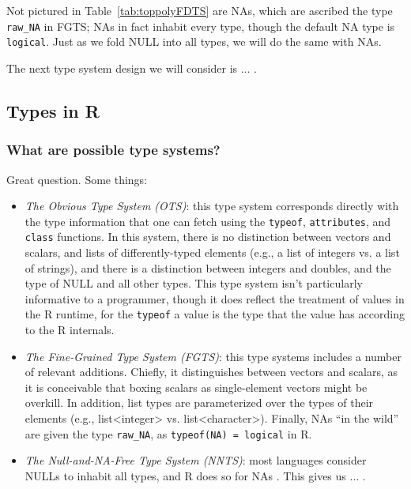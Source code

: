 \documentclass[acmsmall,10pt,review,anonymous]{acmart}\settopmatter{printfolios=true,printccs=false,printacmref=false}
\begin{document}
Not pictured in Table~\ref{tab:toppolyFDTS} are NAs, which are ascribed the type {\tt raw\_NA} in FGTS; NAs in fact inhabit every type, though the default NA type is {\tt logical}.
Just as we fold NULL into all types, we will do the same with NAs.

The next type system design we will consider is ... .

%
%
%
%
\subsection{Types in R}


%
%
\subsubsection{What are possible type systems?}

Great question.
Some things:

\begin{itemize}

\item {\it The Obvious Type System (OTS)}: this type system corresponds directly with the type information that one can fetch using the {\tt typeof}, {\tt attributes}, and {\tt class} functions.
In this system, there is no distinction between vectors and scalars, and lists of differently-typed elements (e.g., a list of integers vs. a list of strings), and there is a distinction between integers and doubles, and the type of NULL and all other types.
This type system isn't particularly informative to a programmer, though it does reflect the treatment of values in the R runtime, for the {\tt typeof} a value is the type that the value has according to the R internals.

\item {\it The Fine-Grained Type System (FGTS)}: this type systems includes a number of relevant additions.
Chiefly, it distinguishes between vectors and scalars, as it is conceivable that boxing scalars as single-element vectors might be overkill.
In addition, list types are parameterized over the types of their elements (e.g., list<integer> vs. list<character>).
Finally, NAs ``in the wild'' are given the type {\tt raw\_NA}, as {\tt typeof(NA) = logical} in R.

\item {\it The Null-and-NA-Free Type System (NNTS)}: most languages consider NULLs to inhabit all types, and R does so for NAs .
This gives us ... .

\end{itemize}
\end{document}
